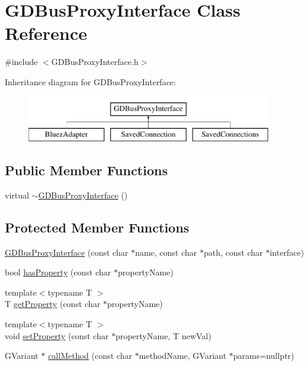 \hypertarget{classGDBusProxyInterface}{}\section{G\+D\+Bus\+Proxy\+Interface Class Reference}
\label{classGDBusProxyInterface}


{\ttfamily \#include $<$G\+D\+Bus\+Proxy\+Interface.\+h$>$}

Inheritance diagram for G\+D\+Bus\+Proxy\+Interface\+:\begin{figure}[H]
\begin{center}
\leavevmode
\includegraphics[height=2.000000cm]{classGDBusProxyInterface}
\end{center}
\end{figure}
\subsection*{Public Member Functions}
\begin{DoxyCompactItemize}
\item 
virtual \mbox{\hyperlink{classGDBusProxyInterface_a39d15bc9bd09872fca2d527ee71027cc}{$\sim$\+G\+D\+Bus\+Proxy\+Interface}} ()
\end{DoxyCompactItemize}
\subsection*{Protected Member Functions}
\begin{DoxyCompactItemize}
\item 
\mbox{\hyperlink{classGDBusProxyInterface_aeee8c517864f62a7ee9da5836855cf0d}{G\+D\+Bus\+Proxy\+Interface}} (const char $\ast$name, const char $\ast$path, const char $\ast$interface)
\item 
bool \mbox{\hyperlink{classGDBusProxyInterface_a797ba1ae2a746b4bcbd6b3606f4e0b02}{has\+Property}} (const char $\ast$property\+Name)
\item 
{\footnotesize template$<$typename T $>$ }\\T \mbox{\hyperlink{classGDBusProxyInterface_a3256b66ee5c124db6df45aa85ad620a7}{get\+Property}} (const char $\ast$property\+Name)
\item 
{\footnotesize template$<$typename T $>$ }\\void \mbox{\hyperlink{classGDBusProxyInterface_a7153d71bbda4ba30f3100d02684ba279}{set\+Property}} (const char $\ast$property\+Name, T new\+Val)
\item 
G\+Variant $\ast$ \mbox{\hyperlink{classGDBusProxyInterface_a9bd8a5b7f66ba2d56575a120bbac5c64}{call\+Method}} (const char $\ast$method\+Name, G\+Variant $\ast$params=nullptr)
\end{DoxyCompactItemize}


